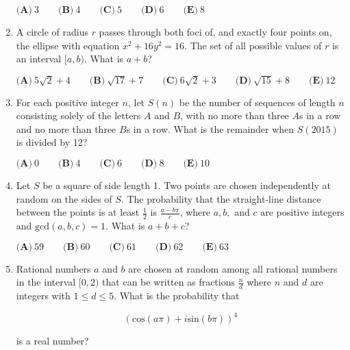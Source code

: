 \documentclass{article}
\begin{document}
\begin{enumerate}[label=\arabic*., itemsep=0.5em]
\( \textbf{(A)}\ 3 \qquad\textbf{(B)}\ 4 \qquad\textbf{(C)}\ 5 \qquad\textbf{(D)}\ 6 \qquad\textbf{(E)}\ 8\)\par \vspace{0.5em}\item A circle of radius \(r\) passes through both foci of, and exactly four points on, the ellipse with equation \(x^2+16y^2=16\). The set of all possible values of \(r\) is an interval \([a,b)\). What is \(a+b\)?

\( \textbf{(A)}\ 5\sqrt{2}+4 \qquad\textbf{(B)}\ \sqrt{17}+7 \qquad\textbf{(C)}\ 6\sqrt{2}+3 \qquad\textbf{(D)}\ \sqrt{15}+8 \qquad\textbf{(E)}\ 12\)\par \vspace{0.5em}\item For each positive integer \(n\), let \(S(n)\) be the number of sequences of length \(n\) consisting solely of the letters \(A\) and \(B\), with no more than three \(A\)s in a row and no more than three \(B\)s in a row. What is the remainder when \(S(2015)\) is divided by 12?

\( \textbf{(A)}\ 0 \qquad\textbf{(B)}\ 4 \qquad\textbf{(C)}\ 6 \qquad\textbf{(D)}\ 8 \qquad\textbf{(E)}\ 10\)\par \vspace{0.5em}\item Let \(S\) be a square of side length 1. Two points are chosen independently at random on the sides of \(S\). The probability that the straight-line distance between the points is at least \(\frac12\) is \(\frac{a-b\pi}{c}\), where \(a,b,\) and \(c\) are positive integers and \(\text{gcd}(a,b,c) = 1\). What is \(a+b+c\)?

\( \textbf{(A)}\ 59 \qquad\textbf{(B)}\ 60 \qquad\textbf{(C)}\ 61 \qquad\textbf{(D)}\ 62 \qquad\textbf{(E)}\ 63\)\par \vspace{0.5em}\item Rational numbers \(a\) and \(b\) are chosen at random among all rational numbers in the interval \([0,2)\) that can be written as fractions \(\frac{n}{d}\) where \(n\) and \(d\) are integers with \(1 \le d \le 5\). What is the probability that

\begin{equation*}
(\text{cos}(a\pi)+i\text{sin}(b\pi))^4
\end{equation*}

is a real number?


\end{enumerate}
\end{document}
